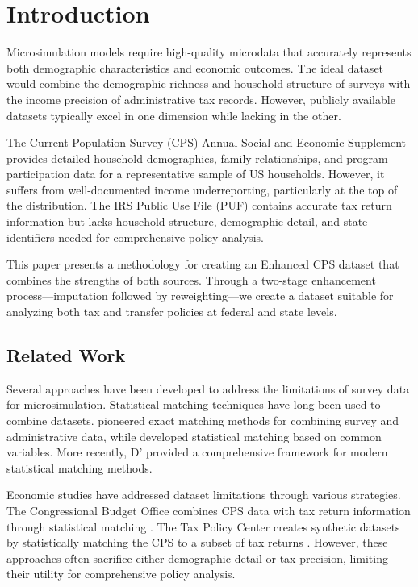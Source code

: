 \section{Introduction}

Microsimulation models require high-quality microdata that accurately represents both demographic characteristics and economic outcomes. The ideal dataset would combine the demographic richness and household structure of surveys with the income precision of administrative tax records. However, publicly available datasets typically excel in one dimension while lacking in the other.

The Current Population Survey (CPS) Annual Social and Economic Supplement provides detailed household demographics, family relationships, and program participation data for a representative sample of US households. However, it suffers from well-documented income underreporting, particularly at the top of the distribution. The IRS Public Use File (PUF) contains accurate tax return information but lacks household structure, demographic detail, and state identifiers needed for comprehensive policy analysis.

This paper presents a methodology for creating an Enhanced CPS dataset that combines the strengths of both sources. Through a two-stage enhancement process—imputation followed by reweighting—we create a dataset suitable for analyzing both tax and transfer policies at federal and state levels.

\subsection{Related Work}

Several approaches have been developed to address the limitations of survey data for microsimulation. Statistical matching techniques have long been used to combine datasets. \citet{radner1978} pioneered exact matching methods for combining survey and administrative data, while \citet{rodgers1984} developed statistical matching based on common variables. More recently, D'\citet{orazio2006} provided a comprehensive framework for modern statistical matching methods.

Economic studies have addressed dataset limitations through various strategies. The Congressional Budget Office combines CPS data with tax return information through statistical matching \citep{cbo2022}. The Tax Policy Center creates synthetic datasets by statistically matching the CPS to a subset of tax returns \citep{rohaly2005}. However, these approaches often sacrifice either demographic detail or tax precision, limiting their utility for comprehensive policy analysis.

